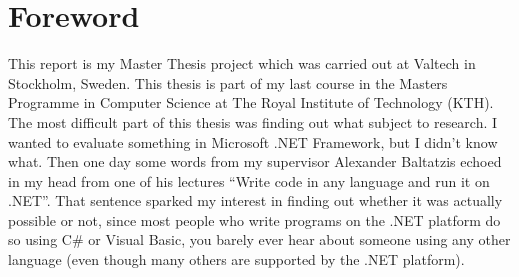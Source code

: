 \chapter*{Foreword}

This report is my Master Thesis project which was carried out at Valtech in Stockholm, Sweden. This thesis is part of my last course in the Masters Programme in Computer Science at The Royal Institute of Technology (KTH). The most difficult part of this thesis was finding out what subject to research. I wanted to evaluate something in Microsoft .NET Framework, but I didn't know what. Then one day some words from my supervisor Alexander Baltatzis echoed in my head from one of his lectures ``Write code in any language and run it on .NET''. That sentence sparked my interest in finding out whether it was actually possible or not, since most people who write programs on the .NET platform do so using C\# or Visual Basic, you barely ever hear about someone using any other language (even though many others are supported by the .NET platform). 